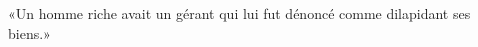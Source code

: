 \encetemps \jesusdisciplesparabole
	«Un homme riche avait un gérant
	qui lui fut dénoncé comme dilapidant ses biens.»
